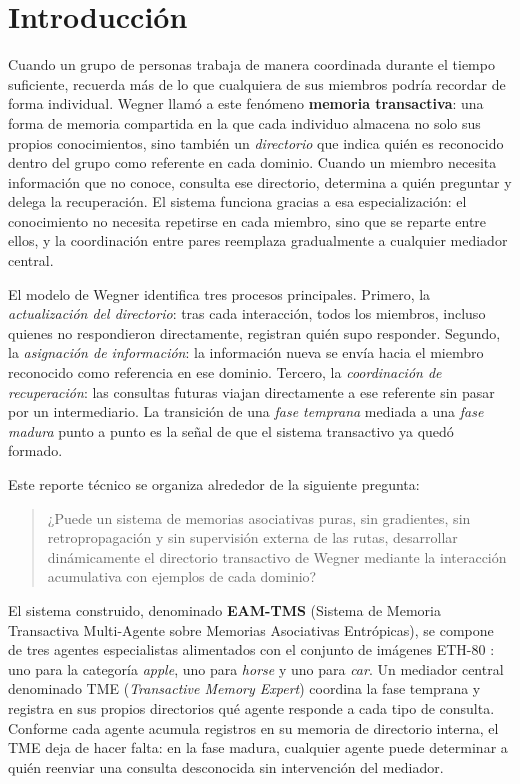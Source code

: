 \section{Introducción}
\label{sec:introduccion}

Cuando un grupo de personas trabaja de manera coordinada durante el tiempo suficiente,
recuerda más de lo que cualquiera de sus miembros podría
recordar de forma individual.
Wegner \cite{wegner1987transactive} llamó a este fenómeno
\textbf{memoria transactiva}: una forma de memoria compartida en la que cada individuo
almacena no solo sus propios conocimientos, sino también un \emph{directorio} que indica quién es reconocido 
dentro del grupo como referente en cada dominio.
Cuando un miembro necesita información que no conoce, consulta ese directorio,
determina a quién preguntar y delega la recuperación.
El sistema funciona gracias a esa especialización: el conocimiento no necesita repetirse en cada miembro, 
sino que se reparte entre ellos, y la coordinación entre pares reemplaza gradualmente a cualquier mediador central.

El modelo de Wegner identifica tres procesos principales.
Primero, la \emph{actualización del directorio}: tras cada interacción, todos los
miembros, incluso quienes no respondieron directamente, registran quién supo responder.
Segundo, la \emph{asignación de información}: la información nueva se envía
hacia el miembro reconocido como referencia en ese dominio.
Tercero, la \emph{coordinación de recuperación}: las consultas futuras viajan directamente
a ese referente sin pasar por un intermediario.
La transición de una \emph{fase temprana} mediada a una \emph{fase madura} punto a punto
es la señal de que el sistema transactivo ya quedó formado.

Este reporte técnico se organiza alrededor de la siguiente pregunta:

\begin{quote}
¿Puede un sistema de memorias asociativas puras, sin gradientes, sin
retropropagación y sin supervisión externa de las rutas, desarrollar
dinámicamente el directorio transactivo de Wegner mediante la interacción
acumulativa con ejemplos de cada dominio?
\end{quote}

El sistema construido, denominado \textbf{EAM-TMS} (Sistema de Memoria Transactiva Multi-Agente sobre Memorias Asociativas Entrópicas), se compone de tres agentes especialistas
alimentados con el conjunto de imágenes ETH-80 \cite{leibe2003eth80}: uno para la
categoría \textit{apple}, uno para \textit{horse} y uno para \textit{car}.
Un mediador central denominado TME (\textit{Transactive Memory Expert}) coordina la fase
temprana y registra en sus propios directorios qué agente responde a cada tipo de
consulta.
Conforme cada agente acumula registros en su memoria de directorio interna,
el TME deja de hacer falta: en la fase madura, cualquier agente puede determinar
a quién reenviar una consulta desconocida sin intervención del mediador.

